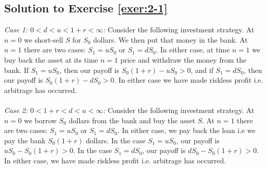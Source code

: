 \documentclass[12pt]{book}
\numberwithin{equation}{chapter}
\theoremstyle{plain}
\numberwithin{theorem}{section}
\theoremstyle{definition}
\numberwithin{exercise}{chapter}
\newcommand{\<}{\langle}
\renewcommand{\>}{\rangle}
\renewcommand{\(}{\left(}
\renewcommand{\)}{\right)}
\renewcommand{\[}{\left[}
\renewcommand{\]}{\right]}
\theoremstyle{definition}
\numberwithin{question}{section}
\begin{document}
\subsection*{Solution to Exercise \ref{exer:2-1}}
\textit{Case 1: $0 < d < u < 1+r < \infty$:} Consider the following investment strategy. At $n = 0$ we short-sell $S$ for $S_0$ dollars. We then put that money in the bank. At $n = 1$ there are two cases: $S_1 = u S_0$ or $S_1 = d S_0$. In either case, at time $n = 1$ we buy back the asset at its time $n = 1$ price and withdraw the money from the bank. If $S_1 = u S_0$, then our payoff is $S_0 (1+r) - u S_0 > 0$, and if $S_1 = d S_0$, then our payoff is $S_0 (1+r) - d S_0 > 0$. In either case we have made riskless profit i.e. arbitrage has occurred.  \\
\\[0.5em]
\textit{Case 2: $0 < 1+r < d < u < \infty$:} Consider the following investment strategy. At $n=0$ we borrow $S_0$ dollars from the bank and buy the asset $S$.  At $n = 1$ there are two cases: $S_1 = u S_0$ or $S_1 = d S_0$. In either case, we pay back the loan i.e we pay the bank $S_0 (1+r)$ dollars. In the case $S_1 = u S_0$, our payoff is $u S_0 - S_0 (1+r) > 0$. In the case $S_1 = d S_0$, our payoff is $d S_0 - S_0 (1+r) > 0$. In either case, we have made riskless profit i.e. arbitrage has occurred. 

\end{document}

